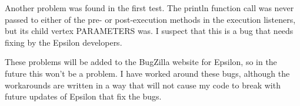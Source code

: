 Another problem was found in the first test. The println function call was never passed to either of the pre- or post-execution methods in the execution listeners, but its child vertex PARAMETERS was. I suspect that this is a bug that needs fixing by the Epsilon developers. 

These problems will be added to the BugZilla website for Epsilon, so in the future this won't be a problem. I have worked around these bugs, although the workarounds are written in a way that will not cause my code to break with future updates of Epsilon that fix the bugs. 